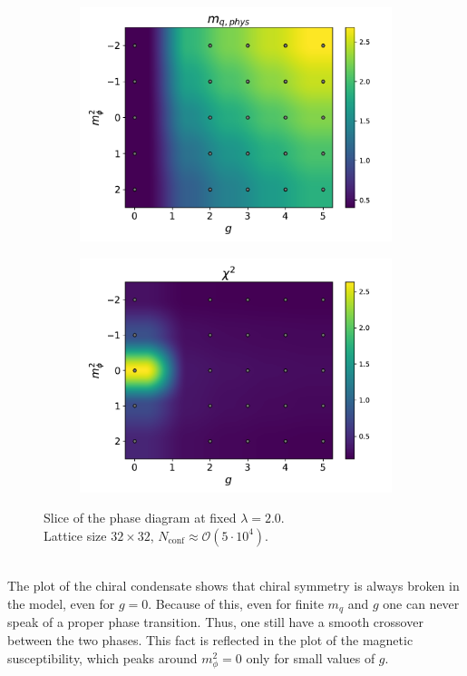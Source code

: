 \begin{figure}[htp]
\begin{subfigure}[b]{0.48\textwidth}
        \includegraphics[width=\textwidth]{figures/phase_diagram/g-m/phase_diagram_mqphys.pdf}
    \end{subfigure}
    \begin{subfigure}[b]{0.48\textwidth}
        \includegraphics[width=\textwidth]{figures/phase_diagram/g-m/phase_diagram_chi2.pdf}
    \end{subfigure}
    \caption{Slice of the phase diagram at fixed $\lambda = 2.0$. \\ Lattice size $32 \times 32$, $N_\text{conf} \approx \mathcal{O}(5 \cdot 10^4)$.}
    \label{fig:phase_diagram_g_m}
\end{figure}\\
The plot of the chiral condensate shows that chiral symmetry is always broken in the model, even for $g=0$. Because of this, even for finite $m_q$ and $g$ one can never speak of a proper phase transition. Thus, one still have a smooth crossover between the two phases. This fact is reflected in the plot of the magnetic susceptibility, which peaks around $m_\phi^2 = 0$ only for small values of $g$. \\

